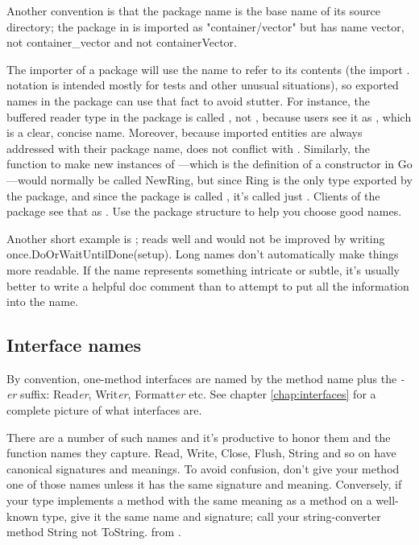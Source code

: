 Another convention is that the package name is the base name of its
source directory; the package in  is imported as
"container/vector" but has name vector, not container\_vector and not
containerVector.

The importer of a package will use the name to refer to its contents
(the import . notation is intended mostly for tests and other unusual
situations), so exported names in the package can use that fact to avoid
stutter. For instance, the buffered reader type in the  package is
called , not , because users see it as
,
which is a clear, concise name. Moreover, because imported entities are
always addressed with their package name,  does not conflict
with . Similarly, the function to make new instances of
—which is the definition of a constructor in Go—would normally
be called NewRing, but since Ring is the only type exported by the
package, and since the package is called , it's called
just .
Clients of the package see that as . Use the package structure
to help you choose good names.

Another short example is ;  reads well and would
not be improved by writing once.DoOrWaitUntilDone(setup). Long names
don't automatically make things more readable. If the name represents
something intricate or subtle, it's usually better to write a helpful
doc comment than to attempt to put all the information into the name.

\subsection{Interface names}
By convention, one-method interfaces are named by the method name plus
the \emph{-er} suffix: Read\emph{er}, Writ\emph{er}, Formatt\emph{er} etc. See chapter
\ref{chap:interfaces} for a complete picture of what interfaces are.

There are a number of such names and it's productive to honor them and
the function names they capture. Read, Write, Close, Flush, String and
so on have canonical signatures and meanings. To avoid confusion, don't
give your method one of those names unless it has the same signature and
meaning. Conversely, if your type implements a method with the same
meaning as a method on a well-known type, give it the same name and
signature; call your string-converter method String not ToString.
from \cite{effective_go}.

